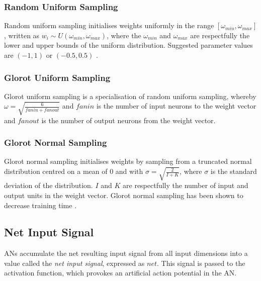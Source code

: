 \subsubsection{Random Uniform Sampling}\label{sec:anns:an:weights:random_uniform_sampling}

Random uniform sampling initialises weights uniformly in the range $[\omega_{min}, \omega_{max}]$, written as $w_{i} \sim \textit{U} (\omega_{min}, \omega_{max})$, where the $\omega_{min}$ and $\omega_{max}$ are respectfully the lower and upper bounds of the uniform distribution. Suggested parameter values are $(-1, 1)$ or $(-0.5, 0.5)$ \cite{ref:nguyen:1990}.


\subsubsection{Glorot Uniform Sampling}\label{sec:anns:an:weights:glorot_uniform_sampling}

Glorot uniform sampling is a specialisation of random uniform sampling, whereby $\omega = \sqrt{\frac{6}{fanin + fanout}}$ and $fanin$ is the number of input neurons to the weight vector and $fanout$ is the number of output neurons from the weight vector.

\subsubsection{Glorot Normal Sampling}\label{sec:anns:an:weights:glorot_normal_sampling}

Glorot normal sampling initialises weights by sampling from a truncated normal distribution centred on a mean of $0$ and with $\sigma = \sqrt{\frac{2}{I + K}}$, where $\sigma$ is the standard deviation of the distribution. $I$ and $K$ are respectfully the number of input and output units in the weight vector. Glorot normal sampling has been shown to decrease training time \cite{ref:glorot:2010}.


\subsection{Net Input Signal}\label{sec:anns:an:net_input}

\acp{AN} accumulate the net resulting input signal from all input dimensions into a value called the \textit{net input signal}, expressed as $net$. This signal is passed to the activation function, which provokes an artificial action potential in the \acs{AN}.

